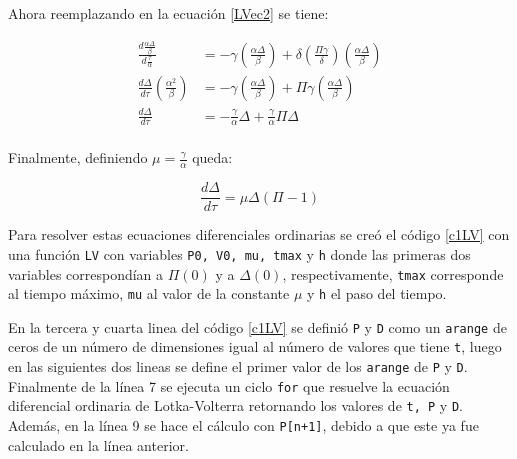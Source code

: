\documentclass[../portafolio.tex]{subfiles}
\begin{document}
 Ahora reemplazando en la ecuación \ref{LVec2} se tiene:
 
 \begin{align*}
     \frac{d\frac{\alpha \Delta}{\beta}}{d\frac{\tau}{\alpha}} &=  -\gamma \left(\frac{\alpha \Delta}{\beta} \right)  +  \delta \left(\frac{\Pi \gamma}{\delta}\right) \left(\frac{\alpha\Delta}{\beta}\right) \\
     \frac{d\Delta}{d\tau} \left( \frac{\alpha^2}{\beta}\right) &=     -\gamma \left(\frac{\alpha \Delta}{\beta} \right)  +  \Pi \gamma \left(\frac{\alpha\Delta}{\beta}\right)\\
     \frac{d\Delta}{d\tau} &= -\frac{\gamma}{\alpha} \Delta  + \frac{\gamma}{\alpha} \Pi \Delta\\
\end{align*}

Finalmente, definiendo $\mu= \frac{\gamma}{\alpha}$ queda:

\begin{equation}
     \frac{d\Delta}{d\tau} = \mu\Delta\left( \Pi - 1\right)
\end{equation}

\vspace{5mm}
Para resolver estas ecuaciones diferenciales ordinarias se creó el código \ref{c1LV}  con una función \texttt{LV} con variables \texttt{P0, V0, mu, tmax} y \texttt{h} donde las primeras dos variables correspondían a $\Pi(0)$ y a $\Delta(0)$, respectivamente, \texttt{tmax} corresponde al tiempo máximo, \texttt{mu} al valor de la constante $\mu$ y \texttt{h} el paso del tiempo. 


En la tercera y cuarta linea del código \ref{c1LV} se definió \texttt{P} y \texttt{D} como un \texttt{arange} de ceros de un número de dimensiones igual al número de valores que tiene \texttt{t}, luego en las siguientes dos lineas se define el primer valor de los \texttt{arange} de \texttt{P} y \texttt{D}. Finalmente de la línea 7 se ejecuta un ciclo \texttt{for} que resuelve la ecuación diferencial ordinaria de Lotka-Volterra retornando los valores de \texttt{t, P} y \texttt{D}. Además, en la línea 9 se hace el cálculo con \texttt{P[n+1]}, debido a que este ya fue calculado en la línea anterior.
\end{document}
